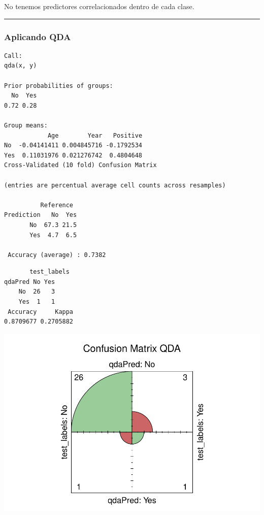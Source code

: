 \documentclass[
]{article}
\begin{document}
No tenemos predictores correlacionados dentro de cada clase.

\begin{center}\rule{0.5\linewidth}{0.5pt}\end{center}

\hypertarget{aplicando-qda}{%
\subsubsection{Aplicando QDA}\label{aplicando-qda}}

\begin{verbatim}
Call:
qda(x, y)

Prior probabilities of groups:
  No  Yes 
0.72 0.28 

Group means:
            Age        Year   Positive
No  -0.04141411 0.004845716 -0.1792534
Yes  0.11031976 0.021276742  0.4804648
Cross-Validated (10 fold) Confusion Matrix 

(entries are percentual average cell counts across resamples)
 
          Reference
Prediction   No  Yes
       No  67.3 21.5
       Yes  4.7  6.5
                            
 Accuracy (average) : 0.7382
\end{verbatim}

\begin{verbatim}
       test_labels
qdaPred No Yes
    No  26   3
    Yes  1   1
 Accuracy     Kappa 
0.8709677 0.2705882 
\end{verbatim}

\begin{center}\includegraphics{Clasificacion_files/figure-latex/unnamed-chunk-31-1} \end{center}
\end{document}
